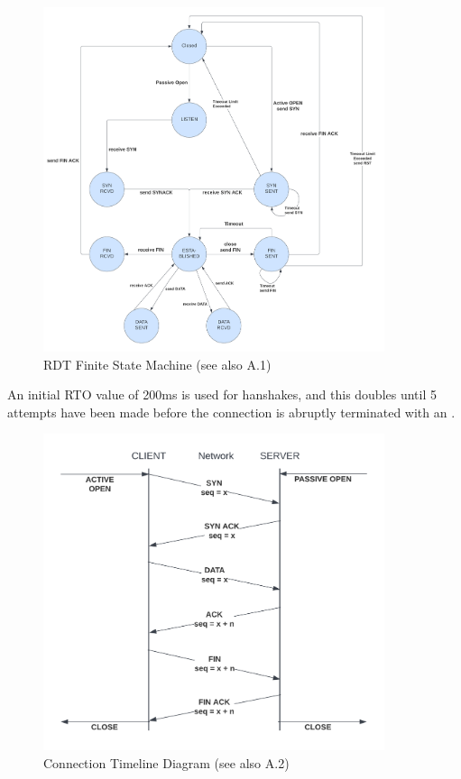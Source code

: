 \begin{figure}[H]
\begin{center}
    \includegraphics[width=100mm]{images/fsm.png}
\end{center}
\caption{RDT Finite State Machine (see also A.1)}\label{fig:fsm}
\end{figure}

An initial RTO value of 200ms is used for hanshakes, and this doubles until 5 attempts have been made before the connection is abruptly terminated with an .

\begin{figure}[H]
\begin{center}
    \includegraphics[width=100mm]{images/timeline.png}
\end{center}
\caption{Connection Timeline Diagram (see also A.2)}\label{fig:timeline}
\end{figure}
    

